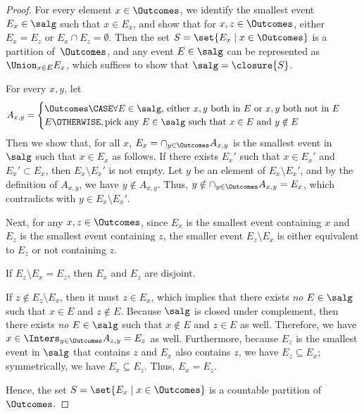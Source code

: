\begin{proof}
  For every element $x \in \Outcomes$,
  we identify the smallest event $E_x \in \salg$ such that $x \in E_x$,
  and show that for $x, z \in \Outcomes$,
  either $E_x = E_z$ or $E_x \cap E_z = \emptyset$.
  Then the set $S = \set{E_x \mid x \in \Outcomes}$
  is a partition of~$\Outcomes$,
  and any event $E \in \salg$ can be represented as
  $\Union_{x \in E} E_x$, which suffices to show that $\salg = \closure{S}$.

  For every $x, y$, let
\begin{align*}
    A_{x, y} &=
    \begin{cases}
      \Outcomes \CASE \text{$\forall E \in \salg$, either $x , y$ both in~$E$ or $x , y$ both not in~$E$} \\
      E \OTHERWISE, \text{pick any $E \in \salg$ such that $x \in E$ and $y \notin E$}
    \end{cases}
  \end{align*}
Then we show that, for all $x$,
  $E_x = \cap_{y \in \Outcomes} A_{x, y}$ is the smallest
  event in $\salg$ such that $x \in E_x$ as follows.
  If there exists $E_x'$ such that $x \in E_x'$ and $E_x' \subset E_x$,
  then $E_x \setminus E_x'$ is not empty. Let $y$ be an element of
  $E_x \setminus E_x'$, and by the definition of $A_{x, y}$, we have
  $y \notin A_{x,y}$. Thus, $y \notin \cap_{y \in \Outcomes} A_{x, y} = E_x$,
  which contradicts with $y \in E_x \setminus E_x'$.

  Next, for any  $x, z \in \Outcomes$,
  since $E_x$ is the smallest event containing $x$ and
  $E_z$ is the smallest event containing $z$,
  the smaller event $E_z \setminus E_x$ is either equivalent to
  $E_z$ or not containing $z$.
  \begin{casesplit}
    \item
      If $E_z \setminus E_x = E_z$, then $E_x$ and $E_z$ are
      disjoint.
    \item If $z \not\in E_z \setminus E_x$, then it must $z \in E_x$,
      which implies that there exists \emph{no} $E \in \salg$ such that
      $x \in E$ and $z \notin E$. Because $\salg$ is closed under
      complement, then there exists \emph{no} $E \in \salg$ such that
      $x \notin E$ and $z \in E$ as well. Therefore,
      we have $x \in  \Inters_{y \in \Outcomes} A_{z, y} = E_z$ as well.
      Furthermore, because $E_z$ is the smallest event in
      $\salg$ that contains $z$ and $E_x$ also contains $z$,
      we have $E_z \subseteq E_x$; symmetrically, we have
      $E_x \subseteq E_z$.
      Thus, $E_x = E_z$.
    \end{casesplit}
    Hence,  the set $S = \set{E_x \mid x \in \Outcomes}$ is a
    countable partition of~$\Outcomes$.
\end{proof}

